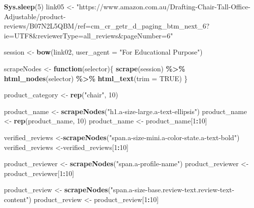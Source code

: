 \documentclass[
]{article}
\newenvironment{Shaded}{\begin{snugshade}}{\end{snugshade}}
\newcommand{\AttributeTok}[1]{\textcolor[rgb]{0.13,0.29,0.53}{#1}}
\newcommand{\ConstantTok}[1]{\textcolor[rgb]{0.56,0.35,0.01}{#1}}
\newcommand{\ControlFlowTok}[1]{\textcolor[rgb]{0.13,0.29,0.53}{\textbf{#1}}}
\newcommand{\DecValTok}[1]{\textcolor[rgb]{0.00,0.00,0.81}{#1}}
\newcommand{\FunctionTok}[1]{\textcolor[rgb]{0.13,0.29,0.53}{\textbf{#1}}}
\newcommand{\NormalTok}[1]{#1}
\newcommand{\OtherTok}[1]{\textcolor[rgb]{0.56,0.35,0.01}{#1}}
\newcommand{\SpecialCharTok}[1]{\textcolor[rgb]{0.81,0.36,0.00}{\textbf{#1}}}
\newcommand{\StringTok}[1]{\textcolor[rgb]{0.31,0.60,0.02}{#1}}
\begin{document}
\begin{Shaded}
\begin{Highlighting}[]
   \FunctionTok{Sys.sleep}\NormalTok{(}\DecValTok{5}\NormalTok{)}
\NormalTok{link05 }\OtherTok{\textless{}{-}} \StringTok{"https://www.amazon.com.au/Drafting{-}Chair{-}Tall{-}Office{-}Adjustable/product{-}reviews/B07N2L5QBM/ref=cm\_cr\_getr\_d\_paging\_btm\_next\_6?ie=UTF8\&reviewerType=all\_reviews\&pageNumber=6"}


\NormalTok{  session }\OtherTok{\textless{}{-}} \FunctionTok{bow}\NormalTok{(link02,}
               \AttributeTok{user\_agent =} \StringTok{"For Educational Purpose"}\NormalTok{)}

\NormalTok{  scrapeNodes }\OtherTok{\textless{}{-}} \ControlFlowTok{function}\NormalTok{(selector)\{}
    \FunctionTok{scrape}\NormalTok{(session) }\SpecialCharTok{\%\textgreater{}\%}
      \FunctionTok{html\_nodes}\NormalTok{(selector) }\SpecialCharTok{\%\textgreater{}\%}
      \FunctionTok{html\_text}\NormalTok{(}\AttributeTok{trim =} \ConstantTok{TRUE}\NormalTok{)}
\NormalTok{  \}}

\NormalTok{  product\_category }\OtherTok{\textless{}{-}} \FunctionTok{rep}\NormalTok{(}\StringTok{"chair"}\NormalTok{, }\DecValTok{10}\NormalTok{)}

\NormalTok{  product\_name }\OtherTok{\textless{}{-}} \FunctionTok{scrapeNodes}\NormalTok{(}\StringTok{"h1.a{-}size{-}large.a{-}text{-}ellipsis"}\NormalTok{)}
\NormalTok{  product\_name }\OtherTok{\textless{}{-}} \FunctionTok{rep}\NormalTok{(product\_name, }\DecValTok{10}\NormalTok{)}
\NormalTok{  product\_name }\OtherTok{\textless{}{-}}\NormalTok{ product\_name[}\DecValTok{1}\SpecialCharTok{:}\DecValTok{10}\NormalTok{]}
  
\NormalTok{  verified\_reviews }\OtherTok{\textless{}{-}}\FunctionTok{scrapeNodes}\NormalTok{(}\StringTok{"span.a{-}size{-}mini.a{-}color{-}state.a{-}text{-}bold"}\NormalTok{)}
\NormalTok{  verified\_reviews }\OtherTok{\textless{}{-}}\NormalTok{verified\_reviews[}\DecValTok{1}\SpecialCharTok{:}\DecValTok{10}\NormalTok{]}
  
\NormalTok{  product\_reviewer }\OtherTok{\textless{}{-}} \FunctionTok{scrapeNodes}\NormalTok{(}\StringTok{"span.a{-}profile{-}name"}\NormalTok{)}
\NormalTok{  product\_reviewer }\OtherTok{\textless{}{-}}\NormalTok{ product\_reviewer[}\DecValTok{1}\SpecialCharTok{:}\DecValTok{10}\NormalTok{]}
  
\NormalTok{  product\_review }\OtherTok{\textless{}{-}} \FunctionTok{scrapeNodes}\NormalTok{(}\StringTok{"span.a{-}size{-}base.review{-}text.review{-}text{-}content"}\NormalTok{)}
\NormalTok{  product\_review }\OtherTok{\textless{}{-}}\NormalTok{ product\_review[}\DecValTok{1}\SpecialCharTok{:}\DecValTok{10}\NormalTok{]}
  

\end{Highlighting}
\end{Shaded}
\end{document}
